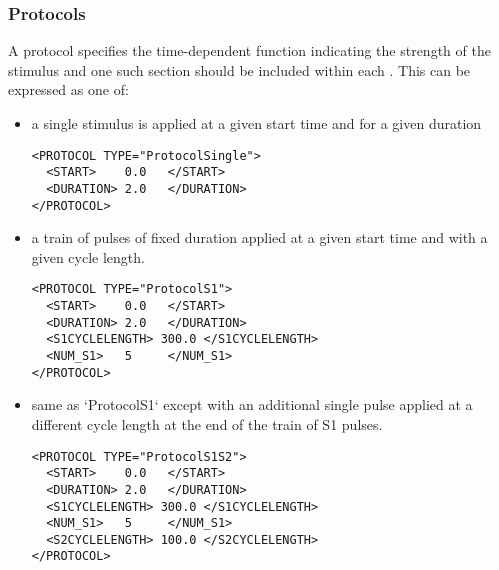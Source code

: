 \subsubsection{Protocols}
A protocol specifies the time-dependent function indicating the strength of the
stimulus and one such  section should be included within each
. This can be expressed as one of:
\begin{itemize}
    \item {} a single stimulus is applied at a given start
    time and for a given duration
\begin{lstlisting}[style=XmlStyle]
<PROTOCOL TYPE="ProtocolSingle">
  <START>    0.0   </START>
  <DURATION> 2.0   </DURATION>
</PROTOCOL>
\end{lstlisting}

    \item {} a train of pulses of fixed duration applied at a
    given start time and with a given cycle length.
\begin{lstlisting}[style=XmlStyle]
<PROTOCOL TYPE="ProtocolS1">
  <START>    0.0   </START>
  <DURATION> 2.0   </DURATION>
  <S1CYCLELENGTH> 300.0 </S1CYCLELENGTH>
  <NUM_S1>   5     </NUM_S1>
</PROTOCOL>
\end{lstlisting}

    \item {} same as `ProtocolS1` except with an additional
    single pulse applied at a different cycle length at the end of the train of S1 pulses.
\begin{lstlisting}[style=XmlStyle]
<PROTOCOL TYPE="ProtocolS1S2">
  <START>    0.0   </START>
  <DURATION> 2.0   </DURATION>
  <S1CYCLELENGTH> 300.0 </S1CYCLELENGTH>
  <NUM_S1>   5     </NUM_S1>
  <S2CYCLELENGTH> 100.0 </S2CYCLELENGTH>
</PROTOCOL>
\end{lstlisting}
\end{itemize}
